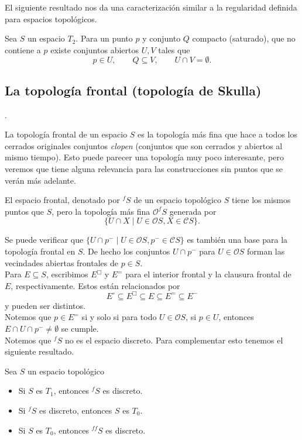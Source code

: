 El siguiente resultado nos da una caracterización similar a la regularidad definida para espacios topológicos. 

\begin{cor}
    Sea $S$ un espacio $T_2$. Para un punto $p$ y conjunto $Q$ compacto (saturado), que no contiene a $p$ existe conjuntos abiertos $U, V$ tales que
    \[
    p\in U, \qquad Q\subseteq V, \qquad U\cap V=\emptyset.
    \]
\end{cor}

\subsection{La topología frontal (topología de Skulla)}.

La topología frontal de un espacio $S$ es la topología más fina que hace a todos los cerrados originales conjuntos \emph{clopen} (conjuntos que son cerrados y abiertos al mismo tiempo). Esto puede parecer una topología muy poco interesante, pero veremos que tiene alguna relevancia para las construcciones sin puntos que se verán más adelante.

\begin{dfn}\label{Frontal}
    El espacio frontal, denotado por $^fS$ de un espacio topológico $S$ tiene los mismos puntos que $S$, pero la topología más fina $\mathcal{O}^fS$ generada por 
    \[
    \{U\cap X\mid U\in \mathcal{O}S, X\in \mathcal{C}S\}.
    \]
\end{dfn}

Se puede verificar que $\{U\cap p^-\mid U\in \mathcal{O}S, p^-\in \mathcal{C}S\}$ es también una base para la topología frontal en $S$. De hecho los conjuntos $U\cap p^-$ para $U\in \mathcal{O}S$ forman las vecindades abiertas frontales de $p\in S$.\\

Para $E\subseteq S$, escribimos $E^\Box$ y $E^=$ para el interior frontal y la clausura frontal de $E$, respectivamente. Estos están relacionados por 
\[
E^\circ\subseteq E^\Box \subseteq E\subseteq E^=\subseteq E^-
\]
y pueden ser distintos.\\

Notemos que $p\in E^=$ si y solo si para todo $U\in \mathcal{O}S$, si $p\in U$, entonces $E\cap U\cap p^-\neq \emptyset$ se cumple.\\

Notemos que $^fS$ no es el espacio discreto. Para complementar esto tenemos el siguiente resultado.

\begin{lem}
    Sea $S$ un espacio topológico
    \begin{itemize}
        \item Si $S$ es $T_1$, entonces $^fS$ es discreto.
        \item Si $^fS$ es discreto, entonces $S$ es $T_0$.
        \item Si $S$ es $T_0$, entonces $^{ff}S$ es discreto.
    \end{itemize}
\end{lem}

